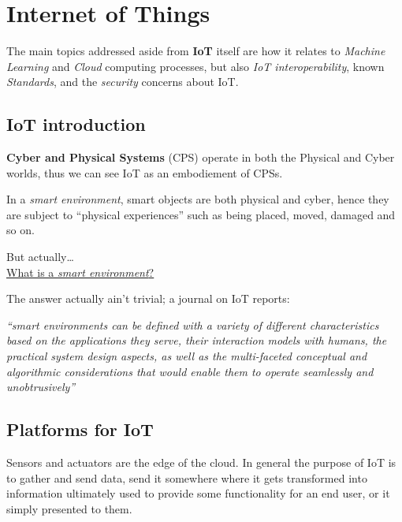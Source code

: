 \chapter{Internet of Things}

The main topics addressed aside from \textbf{IoT} itself are how it relates to \textit{Machine Learning} and \textit{Cloud} computing processes, but also \textit{IoT interoperability}, known \textit{Standards}, and the \textit{security} concerns about IoT.

\section{IoT introduction}
\textbf{Cyber and Physical Systems} (CPS) operate in both the Physical and Cyber worlds, thus we can see IoT as an embodiement of CPSs.

In a \textit{smart environment}, smart objects are both physical and cyber, hence they are subject to ``physical experiences'' such as being placed, moved, damaged and so on.
\begin{center}
   But actually\dots\\
   \ul{What is a \textit{smart environment}?}
\end{center}

The answer actually ain't trivial;
a journal on IoT reports:
\begin{center}
\textit{``smart environments can be defined with a variety of different characteristics based on the applications they serve, their interaction models with humans, the practical system design aspects, as well as the multi-faceted conceptual and algorithmic considerations that would enable them to operate seamlessly and unobtrusively''}
\end{center}

\section{Platforms for IoT}
Sensors and actuators are the edge of the cloud.
In general the purpose of IoT is to gather and send data, send it somewhere where it gets transformed into information ultimately used to provide some functionality for an end user, or it simply presented to them.

